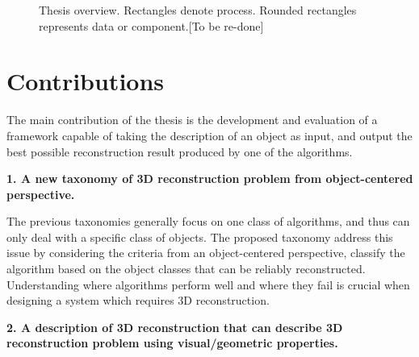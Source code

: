 \begin{figure}[ht]
\caption{Thesis overview. Rectangles denote process. Rounded rectangles represents data or component.[To be re-done]}
\label{fig:system_overview}
\end{figure}

\section{Contributions}
The main contribution of the thesis is the development and evaluation of a framework capable of taking the description of an object as input, and output the best possible reconstruction result produced by one of the algorithms.

\noindent\textbf{1. A new taxonomy of 3D reconstruction problem from object-centered perspective.}

The previous taxonomies generally focus on one class of algorithms, and thus can only deal with a specific class of objects. The proposed taxonomy address this issue by considering the criteria from an object-centered perspective, \ie classify the algorithm based on the object classes that can be reliably reconstructed. Understanding where algorithms perform well and where they fail is crucial when designing a system which requires 3D reconstruction.

\noindent\textbf{2. A description of 3D reconstruction that can describe 3D reconstruction problem using visual/geometric properties.}

